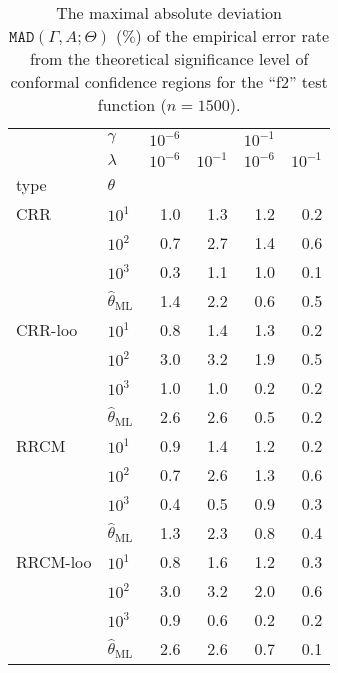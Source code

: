 \documentclass[10pt, conference, compsocconf]{IEEEtran}
\begin{document}
\begin{table}
  \centering
  \caption{The maximal absolute deviation $\mathtt{MAD}(\Gamma, A; \Theta)$ ($\%$)
  of the empirical error rate from the theoretical significance level of conformal
  confidence regions for the ``f2'' test function ($n=1500$).}
  \label{tab:nongaussian_f2_2d_cov_conf}
  \begin{tabular}{ll||rrrr}
  \toprule
       & $\gamma$ & $10^{-6}$ &          & $10^{-1}$ &          \\\cline{2-2}
       & $\lambda$ & $10^{-6}$ & $10^{-1}$ & $10^{-6}$ & $10^{-1}$ \\\cline{2-2}
  type & $\theta$ &          &          &          &          \\
  \midrule
  CRR & $10^1$ &      1.0 &      1.3 &      1.2 &      0.2 \\
       & $10^2$ &      0.7 &      2.7 &      1.4 &      0.6 \\
       & $10^3$ &      0.3 &      1.1 &      1.0 &      0.1 \\
       & $\hat{\theta}_\text{ML}$ &      1.4 &      2.2 &      0.6 &      0.5 \\
  \midrule
  CRR-loo & $10^1$ &      0.8 &      1.4 &      1.3 &      0.2 \\
       & $10^2$ &      3.0 &      3.2 &      1.9 &      0.5 \\
       & $10^3$ &      1.0 &      1.0 &      0.2 &      0.2 \\
       & $\hat{\theta}_\text{ML}$ &      2.6 &      2.6 &      0.5 &      0.2 \\
  \midrule
  RRCM & $10^1$ &      0.9 &      1.4 &      1.2 &      0.2 \\
       & $10^2$ &      0.7 &      2.6 &      1.3 &      0.6 \\
       & $10^3$ &      0.4 &      0.5 &      0.9 &      0.3 \\
       & $\hat{\theta}_\text{ML}$ &      1.3 &      2.3 &      0.8 &      0.4 \\
  \midrule
  RRCM-loo & $10^1$ &      0.8 &      1.6 &      1.2 &      0.3 \\
       & $10^2$ &      3.0 &      3.2 &      2.0 &      0.6 \\
       & $10^3$ &      0.9 &      0.6 &      0.2 &      0.2 \\
       & $\hat{\theta}_\text{ML}$ &      2.6 &      2.6 &      0.7 &      0.1 \\
  \bottomrule
  \end{tabular}
\end{table}
\end{document}
